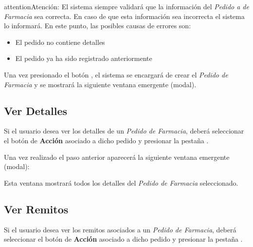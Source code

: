 \documentclass[a4paper,10pt,spanish]{sphinxmanual}
\begin{document}

\begin{notice}{attention}{Atención:}
El sistema siempre validará que la información del \emph{Pedido a de Farmacia} sea correcta. En caso de que esta información sea incorrecta el sistema lo informará.
En este punto, las posibles causas de errores son:
\begin{itemize}
\item {} 
El pedido no contiene detalles

\item {} 
El pedido ya ha sido registrado anteriormente

\end{itemize}
\end{notice}

Una vez presionado el botón , el sistema se encargará de crear el \emph{Pedido de Farmacia} y se mostrará la siguiente ventana emergente (modal).



\subsection{Ver Detalles}
\label{pedidosfarmacia:ver-detalles}\label{pedidosfarmacia:ver-detalles-pf}
Si el usuario desea ver los detalles de un \emph{Pedido de Farmacia}, deberá seleccionar el botón de \textbf{Acción} asociado a dicho pedido y presionar la pestaña .


Una vez realizado el paso anterior aparecerá la siguiente ventana emergente (modal):


Esta ventana mostrará todos los detalles del \emph{Pedido de Farmacia} seleccionado.


\subsection{Ver Remitos}
\label{pedidosfarmacia:ver-remitos}\label{pedidosfarmacia:ver-remitos-pf}
Si el usuario desea ver los remitos asociados a un \emph{Pedido de Farmacia}, deberá seleccionar el botón de \textbf{Acción} asociado a dicho pedido y presionar la pestaña .
\end{document}
